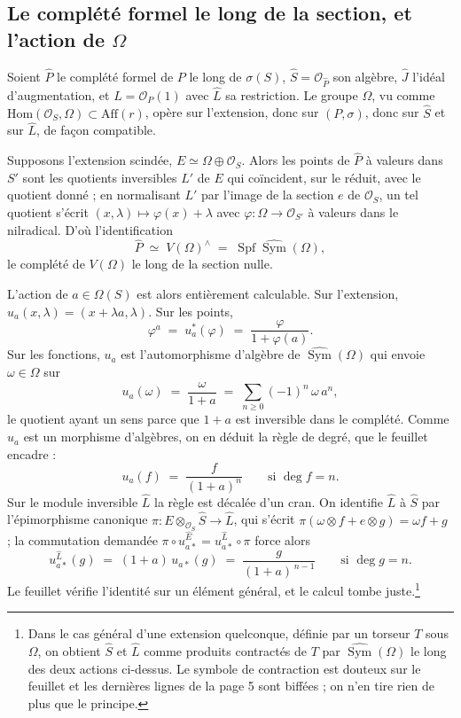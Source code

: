 \documentclass[11pt,a4paper]{article}
\begin{document}
\subsection*{Le complété formel le long de la section, et l'action de $\Omega$}

Soient $\widehat{P}$ le complété formel de $P$ le long de $\sigma(S)$,
$\widehat{S} = \mathcal{O}_{\widehat{P}}$ son algèbre, $\widehat{J}$ l'idéal
d'augmentation, et $L = \mathcal{O}_P(1)$ avec $\widehat{L}$ sa restriction.
Le groupe $\Omega$, vu comme
$\mathrm{Hom}(\mathcal{O}_S, \Omega) \subset \mathrm{Aff}(r)$, opère sur
l'extension, donc sur $(P,\sigma)$, donc sur $\widehat{S}$ et sur
$\widehat{L}$, de façon compatible.

Supposons l'extension scindée, $E \simeq \Omega \oplus \mathcal{O}_S$. Alors
les points de $\widehat{P}$ à valeurs dans $S'$ sont les quotients inversibles
$L'$ de $E$ qui coïncident, sur le réduit, avec le quotient donné ; en
normalisant $L'$ par l'image de la section $e$ de $\mathcal{O}_S$, un tel
quotient s'écrit $(x,\lambda) \mapsto \varphi(x) + \lambda$ avec
$\varphi : \Omega \to \mathcal{O}_{S'}$ à valeurs dans le nilradical. D'où
l'identification
\[
  \widehat{P} \;\simeq\; V(\Omega)^{\wedge}
  \;=\; \operatorname{Spf} \widehat{\operatorname{Sym}}(\Omega),
\]
le complété de $V(\Omega)$ le long de la section nulle.

L'action de $a \in \Omega(S)$ est alors entièrement calculable. Sur
l'extension, $u_a(x,\lambda) = (x + \lambda a, \lambda)$. Sur les points,
\[
  \varphi^a \;=\; u_a^*(\varphi) \;=\; \frac{\varphi}{1 + \varphi(a)} .
\]
Sur les fonctions, $u_a$ est l'automorphisme d'algèbre de
$\widehat{\operatorname{Sym}}(\Omega)$ qui envoie $\omega \in \Omega$ sur
\[
  u_a(\omega) \;=\; \frac{\omega}{1+a}
  \;=\; \sum_{n \geqslant 0} (-1)^n\, \omega\, a^n ,
\]
le quotient ayant un sens parce que $1 + a$ est inversible dans le complété.
Comme $u_a$ est un morphisme d'algèbres, on en déduit la règle de degré, que
le feuillet encadre :
\[
  u_a(f) \;=\; \frac{f}{(1+a)^n} \qquad \text{si } \deg f = n .
\]
Sur le module inversible $\widehat{L}$ la règle est décalée d'un cran. On
identifie $\widehat{L}$ à $\widehat{S}$ par l'épimorphisme canonique
$\pi : E \otimes_{\mathcal{O}_S} \widehat{S} \to \widehat{L}$, qui s'écrit
$\pi(\omega \otimes f + e \otimes g) = \omega f + g$ ; la commutation demandée
$\pi \circ u_{a*}^{\widehat{E}} = u_{a*}^{\widehat{L}} \circ \pi$ force alors
\[
  u_{a*}^{\widehat{L}}(g) \;=\; (1+a)\, u_{a*}(g)
  \;=\; \frac{g}{(1+a)^{\,n-1}} \qquad \text{si } \deg g = n .
\]
Le feuillet vérifie l'identité sur un élément général, et le calcul tombe
juste.\footnote{Dans le cas général d'une extension quelconque, définie par un
torseur $T$ sous $\Omega$, on obtient $\widehat{S}$ et $\widehat{L}$ comme
produits contractés de $T$ par $\widehat{\operatorname{Sym}}(\Omega)$ le long
des deux actions ci-dessus. Le symbole de contraction est douteux sur le
feuillet et les dernières lignes de la page 5 sont biffées ; on n'en tire rien
de plus que le principe.}
\end{document}
